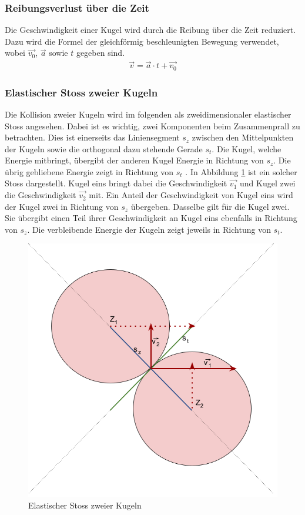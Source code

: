 \subsubsection{Reibungsverlust über die Zeit}
Die Geschwindigkeit einer Kugel wird durch die Reibung über die Zeit reduziert. Dazu wird die Formel der gleichförmig
beschleunigten Bewegung verwendet, wobei $\vec{v_0}$, $\vec{a}$ sowie $t$ gegeben sind.
\begin{align}
    \vec{v} = \vec{a} \cdot t + \vec{v_0}
\end{align}

\subsubsection{Elastischer Stoss zweier Kugeln}
Die Kollision zweier Kugeln wird im folgenden als zweidimensionaler elastischer Stoss angesehen. Dabei ist es wichtig,
zwei Komponenten beim Zusammenprall zu betrachten. Dies ist einerseits das Liniensegment $s_z$ zwischen den Mittelpunkten
der Kugeln sowie die orthogonal dazu stehende Gerade $s_t$. Die Kugel, welche Energie mitbringt, übergibt der anderen
Kugel Energie in Richtung von $s_z$. Die übrig gebliebene Energie zeigt in Richtung von $s_t$ \cite{wiki.elastischer_stoss_physik:1}.
In Abbildung \ref{fig:Elastischer Stoss zweier Kugeln} ist ein solcher Stoss dargestellt.
Kugel eins bringt dabei die Geschwindigkeit $\vec{v_1}$ und Kugel zwei die Geschwindigkeit $\vec{v_2}$ mit. Ein Anteil
der Geschwindigkeit von Kugel eins wird der Kugel zwei in Richtung von $s_z$ übergeben. Dasselbe gilt für die
Kugel zwei. Sie übergibt einen Teil ihrer Geschwindigkeit an Kugel eins ebenfalls in Richtung von $s_z$. Die verbleibende
Energie der Kugeln zeigt jeweils in Richtung von $s_t$.
\begin{figure}[h!]
    \begin{center}
        \includegraphics[width=0.4\linewidth]{../common/03_billiard_ai/resources/23_elastischer_stoss.png}
    \end{center}
    \caption{Elastischer Stoss zweier Kugeln}
    \label{fig:Elastischer Stoss zweier Kugeln}
\end{figure}


